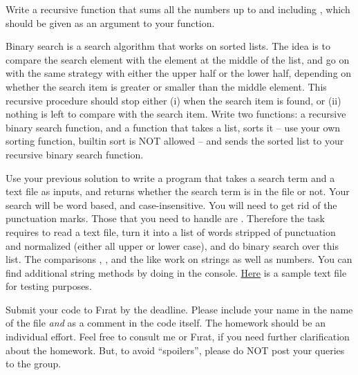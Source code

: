 \documentclass[a4paper]{exam}
\begin{document}
\begin{questions}

\question
Write a recursive function that sums all the numbers up to and including , which should be given as an argument to your function.

\question
 Binary search is a search algorithm that works on sorted lists. The idea is to compare the search element with the element at the middle of the list, and go on with the same strategy with either the upper half or the lower half, depending on whether the search item is greater or smaller than the middle element. This recursive procedure should stop either (i) when the search item is found, or (ii) nothing is left to compare with the search item. Write two functions: a recursive binary search function, and a function that takes a list, sorts it -- use your own sorting function, builtin sort is NOT allowed -- and sends the sorted list to your recursive binary search function.

\question
Use your previous solution to write a program that takes a search term and a text file as inputs, and returns whether the search term is in the file or not. Your search will be word based, and case-insensitive. You will need to get rid of the punctuation marks. Those that you need to handle are \pyv{['.',',','?','!',';',':','"']}. Therefore the task requires to read a text file, turn it into a list of words stripped of punctuation and normalized (either all upper or lower case), and do binary search over this list. The comparisons \pyv{<}, \pyv{>}, and the like work on strings as well as numbers. You can find additional string methods by doing  in the console. \href{https://github.com/umutozge/cogs502/blob/master/exams/code/hw01.txt}{Here} is a sample text file for testing purposes.
  
\end{questions}

\noindent Submit your code to F{\i}rat by the deadline. Please include your name in the name of the file \emph{and} as a comment in the code itself. The homework should be an individual effort. Feel free to consult me or F{\i}rat, if you need further clarification about the homework. But, to avoid ``spoilers'', please do NOT post your queries to the group.
\end{document}
